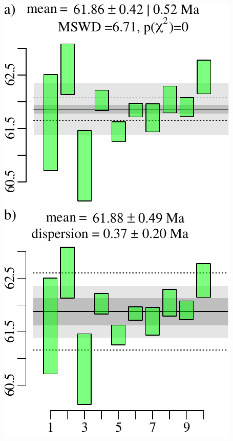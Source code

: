 \begin{refsection}
\noindent\begin{minipage}[t]{.33\linewidth}
\strut\vspace*{-\baselineskip}\newline
\includegraphics[width=\textwidth]{../figures/WtdMeanModel1vsRandomEffects.pdf}
\end{minipage}
\begin{minipage}[t]{.2\linewidth}

\end{minipage}
\end{refsection}

